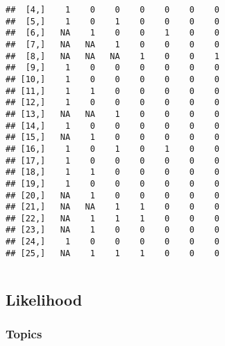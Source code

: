 \documentclass[color=usenames,dvipsnames]{beamer}\usepackage[]{graphicx}\usepackage[]{color}
\makeatletter
\newenvironment{kframe}{%
 \def\at@end@of@kframe{}%
 \ifinner\ifhmode%
  \def\at@end@of@kframe{\end{minipage}}%
  \begin{minipage}{\columnwidth}%
 \fi\fi%
 \def\FrameCommand##1{\hskip\@totalleftmargin \hskip-\fboxsep
 \colorbox{shadecolor}{##1}\hskip-\fboxsep
     \hskip-\linewidth \hskip-\@totalleftmargin \hskip\columnwidth}%
 \MakeFramed {\advance\hsize-\width
   \@totalleftmargin\z@ \linewidth\hsize
   \@setminipage}}%
 {\par\unskip\endMakeFramed%
 \at@end@of@kframe}
\newenvironment{knitrout}{}{} %
\makeatother
\begin{document}
\begin{frame}[fragile]
\begin{columns}
\begin{column}{0.5\textwidth}
\begin{knitrout}
\begin{kframe}
\begin{verbatim}
##  [4,]    1    0    0    0    0    0    0
##  [5,]    1    0    1    0    0    0    0
##  [6,]   NA    1    0    0    1    0    0
##  [7,]   NA   NA    1    0    0    0    0
##  [8,]   NA   NA   NA    1    0    0    1
##  [9,]    1    0    0    0    0    0    0
## [10,]    1    0    0    0    0    0    0
## [11,]    1    1    0    0    0    0    0
## [12,]    1    0    0    0    0    0    0
## [13,]   NA   NA    1    0    0    0    0
## [14,]    1    0    0    0    0    0    0
## [15,]   NA    1    0    0    0    0    0
## [16,]    1    0    1    0    1    0    0
## [17,]    1    0    0    0    0    0    0
## [18,]    1    1    0    0    0    0    0
## [19,]    1    0    0    0    0    0    0
## [20,]   NA    1    0    0    0    0    0
## [21,]   NA   NA    1    1    0    0    0
## [22,]   NA    1    1    1    0    0    0
## [23,]   NA    1    0    0    0    0    0
## [24,]    1    0    0    0    0    0    0
## [25,]   NA    1    1    1    0    0    0
\end{verbatim}
\end{kframe}
\end{knitrout}
    \end{column}
  \end{columns}
\end{frame}



\subsection{Likelihood}


\begin{frame}[plain]
  \frametitle{Topics}
  \Large
\end{frame}
\end{document}
